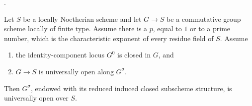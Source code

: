 \begin{lemma}
\label{lemma-prime-to-characteristic-locus-universally-open}
\begin{reference}
\cite[Expos\'e 236, Theorem 1.1(iii), pp. 224 and 226--227]{FGA}.
\end{reference}
Let $S$ be a locally Noetherian scheme and let $G \to S$ be a commutative
group scheme locally of finite type. Assume there is a $p$, equal to $1$ or
to a prime number, which is the characteristic exponent of every residue
field of $S$. Assume
\begin{enumerate}
\item the identity-component locus $G^0$ is closed in $G$, and
\item $G \to S$ is universally open along $G^\sigma$.
\end{enumerate}
Then $G^\sigma$, endowed with its reduced induced closed subscheme structure,
is universally open over $S$.
\end{lemma}

